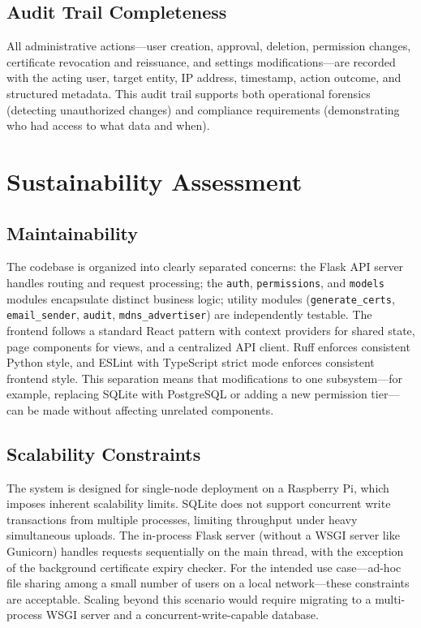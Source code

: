 \documentclass[12pt,letterpaper]{report}
\begin{document}
\subsection{Audit Trail Completeness}

All administrative actions---user creation, approval, deletion, permission changes, certificate revocation and reissuance, and settings modifications---are recorded with the acting user, target entity, IP address, timestamp, action outcome, and structured metadata. This audit trail supports both operational forensics (detecting unauthorized changes) and compliance requirements (demonstrating who had access to what data and when).

\section{Sustainability Assessment}

\subsection{Maintainability}

The codebase is organized into clearly separated concerns: the Flask API server handles routing and request processing; the \texttt{auth}, \texttt{permissions}, and \texttt{models} modules encapsulate distinct business logic; utility modules (\texttt{generate\_certs}, \texttt{email\_sender}, \texttt{audit}, \texttt{mdns\_advertiser}) are independently testable. The frontend follows a standard React pattern with context providers for shared state, page components for views, and a centralized API client. Ruff enforces consistent Python style, and ESLint with TypeScript strict mode enforces consistent frontend style. This separation means that modifications to one subsystem---for example, replacing SQLite with PostgreSQL or adding a new permission tier---can be made without affecting unrelated components.

\subsection{Scalability Constraints}

The system is designed for single-node deployment on a Raspberry Pi, which imposes inherent scalability limits. SQLite does not support concurrent write transactions from multiple processes, limiting throughput under heavy simultaneous uploads. The in-process Flask server (without a WSGI server like Gunicorn) handles requests sequentially on the main thread, with the exception of the background certificate expiry checker. For the intended use case---ad-hoc file sharing among a small number of users on a local network---these constraints are acceptable. Scaling beyond this scenario would require migrating to a multi-process WSGI server and a concurrent-write-capable database.
\end{document}
